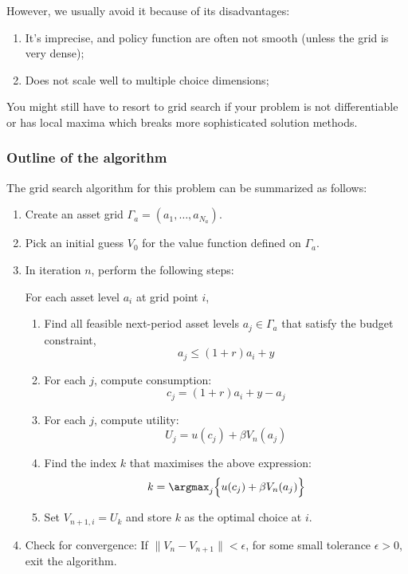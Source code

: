 \documentclass{scrartcl}
\providecommand{\tightlist}{%
      \setlength{\itemsep}{0pt}\setlength{\parskip}{0pt}}
\begin{document}
However, we usually avoid it because of its disadvantages:

\begin{enumerate}
\def\labelenumi{\arabic{enumi}.}
\tightlist
\item
  It's imprecise, and policy function are often not smooth (unless the
  grid is very dense);
\item
  Does not scale well to multiple choice dimensions;
\end{enumerate}

You might still have to resort to grid search if your problem is not
differentiable or has local maxima which breaks more sophisticated
solution methods.

    \hypertarget{outline-of-the-algorithm}{%
\subsubsection*{Outline of the algorithm}\label{outline-of-the-algorithm}}

The grid search algorithm for this problem can be summarized as follows:

\begin{enumerate}
\def\labelenumi{\arabic{enumi}.}
\item
  Create an asset grid \(\Gamma_a = (a_1, \dots, a_{N_a}).\)
\item
  Pick an initial guess \(V_0\) for the value function defined on
  \(\Gamma_a\).
\item
  In iteration \(n\), perform the following steps:

  For each asset level \(a_i\) at grid point \(i\),

  \begin{enumerate}
  \def\labelenumii{\arabic{enumii}.}
  \tightlist
  \item
    Find all feasible next-period asset levels \(a_j \in \Gamma_a\) that
    satisfy the budget constraint, \[a_j \leq (1+r)a_i + y\]
  \item
    For each \(j\), compute consumption: \[c_j = (1+r)a_i + y - a_j\]
  \item
    For each \(j\), compute utility: \[U_j = u(c_j) + \beta V_n(a_j)\]
  \item
    Find the index \(k\) that maximises the above expression:
    \[k = \argmax_{j} \Bigl\{ u(c_j) + \beta V_n(a_j)\Bigr\}\]
  \item
    Set \(V_{n+1,i} = U_k\) and store \(k\) as the optimal choice at
    \(i\).
  \end{enumerate}
\item
  Check for convergence: If \(\|V_n-V_{n+1}\| < \epsilon\), for some
  small tolerance \(\epsilon > 0\), exit the algorithm.
\end{enumerate}
\end{document}
